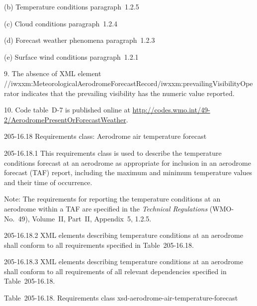 (b) Temperature conditions paragraph~1.2.5

(c) Cloud conditions paragraph~1.2.4

(d) Forecast weather phenomena paragraph~1.2.3

(e) Surface wind conditions paragraph~1.2.1

9. The absence of XML element //iwxxm:MeteorologicalAerodromeForecastRecord/iwxxm:prevailingVisibilityOperator indicates that the prevailing visibility has the numeric value reported.

10. Code table~D-7 is published online at \url{http://codes.wmo.int/49-2/AerodromePresentOrForecastWeather}.

205-16.18 Requirements class: Aerodrome air temperature forecast

205-16.18.1 This requirements class is used to describe the temperature conditions forecast at an aerodrome as appropriate for inclusion in an aerodrome forecast (TAF) report, including the maximum and minimum temperature values and their time of occurrence.

Note: The requirements for reporting the temperature conditions at an aerodrome within a TAF are specified in the \emph{Technical Regulations} (WMO-No.~49), Volume~II, Part~II, Appendix~5, 1.2.5.

205-16.18.2 XML elements describing temperature conditions at an aerodrome shall conform to all requirements specified in Table~205-16.18.

205-16.18.3 XML elements describing temperature conditions at an aerodrome shall conform to all requirements of all relevant dependencies specified in Table~205-16.18.

Table~205-16.18. Requirements class xsd-aerodrome-air-temperature-forecast


